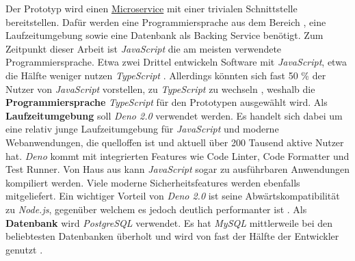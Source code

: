 Der Prototyp wird einen \hyperref[sec:02-02_microservices]{Microservice} mit einer trivialen Schnittstelle bereitstellen. Dafür werden eine Programmiersprache aus dem Bereich , eine Laufzeitumgebung sowie eine Datenbank als Backing Service benötigt. Zum Zeitpunkt dieser Arbeit ist \textit{JavaScript} die am meisten verwendete Programmiersprache. Etwa zwei Drittel entwickeln Software mit \textit{JavaScript}, etwa die Hälfte weniger nutzen \textit{TypeScript} \cite{206:Developer-Survey-2024,207:Developer-Ecosystem}. Allerdings könnten sich fast 50 \% der Nutzer von \textit{JavaScript} vorstellen, zu \textit{TypeScript} zu wechseln \cite{206:Developer-Survey-2024}, weshalb die \textbf{Programmiersprache} \textit{TypeScript} für den Prototypen ausgewählt wird. Als \textbf{Laufzeitumgebung} soll \textit{Deno 2.0} verwendet werden. Es handelt sich dabei um eine relativ junge Laufzeitumgebung für \textit{JavaScript} und moderne Webanwendungen, die quelloffen ist und aktuell über 200 Tausend aktive Nutzer hat. \textit{Deno} kommt mit integrierten Features wie Code Linter, Code Formatter und Test Runner. Von Haus aus kann \textit{JavaScript} sogar zu ausführbaren Anwendungen kompiliert werden. Viele moderne Sicherheitsfeatures werden ebenfalls mitgeliefert. Ein wichtiger Vorteil von \textit{Deno 2.0} ist seine Abwärtskompatibilität zu \textit{Node.js}, gegenüber welchem es jedoch deutlich performanter ist \cite{309:Deno}. Als \textbf{Datenbank} wird \textit{PostgreSQL} verwendet. Es hat \textit{MySQL} mittlerweile bei den beliebtesten Datenbanken überholt und wird von fast der Hälfte der Entwickler genutzt \cite{206:Developer-Survey-2024}.
